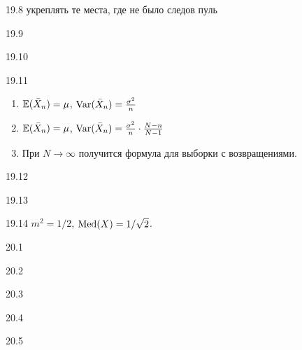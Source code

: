 \protect \hypertarget {soln:19.8}{}
\begin{solution}{{19.8}}
  укреплять те места, где не было следов пуль
\end{solution}
\protect \hypertarget {soln:19.9}{}
\begin{solution}{{19.9}}
\end{solution}
\protect \hypertarget {soln:19.10}{}
\begin{solution}{{19.10}}
\end{solution}
\protect \hypertarget {soln:19.11}{}
\begin{solution}{{19.11}}
\begin{enumerate}
\item $\mathbb{E}(\bar{X}_n) = \mu$, $\operatorname{Var}(\bar{X}_n) = \frac{\sigma^2}{n}$
\item $\mathbb{E}(\bar{X}_n) = \mu$, $\operatorname{Var}(\bar{X}_n) = \frac{\sigma^2}{n} \cdot \frac{N-n}{N-1}$
\item При $N\to \infty$ получится формула для выборки с возвращениями.
\end{enumerate}
\end{solution}
\protect \hypertarget {soln:19.12}{}
\begin{solution}{{19.12}}
\end{solution}
\protect \hypertarget {soln:19.13}{}
\begin{solution}{{19.13}}
\end{solution}
\protect \hypertarget {soln:19.14}{}
\begin{solution}{{19.14}}
  $m^2=1/2$, $\operatorname{Med}(X) = 1/\sqrt{2}$.
\end{solution}
\protect \hypertarget {soln:20.1}{}
\begin{solution}{{20.1}}
\end{solution}
\protect \hypertarget {soln:20.2}{}
\begin{solution}{{20.2}}
\end{solution}
\protect \hypertarget {soln:20.3}{}
\begin{solution}{{20.3}}
\end{solution}
\protect \hypertarget {soln:20.4}{}
\begin{solution}{{20.4}}
\end{solution}
\protect \hypertarget {soln:20.5}{}
\begin{solution}{{20.5}}
\end{solution}
\protect \hypertarget {soln:21.1}{}
